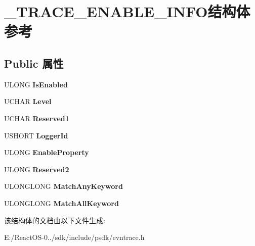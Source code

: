 \hypertarget{struct___t_r_a_c_e___e_n_a_b_l_e___i_n_f_o}{}\section{\+\_\+\+T\+R\+A\+C\+E\+\_\+\+E\+N\+A\+B\+L\+E\+\_\+\+I\+N\+F\+O结构体 参考}
\label{struct___t_r_a_c_e___e_n_a_b_l_e___i_n_f_o}
\subsection*{Public 属性}
\begin{DoxyCompactItemize}
\item 
\mbox{\label{struct___t_r_a_c_e___e_n_a_b_l_e___i_n_f_o_a775f218e083faada8795287cb9d85104}} 
U\+L\+O\+NG {\bfseries Is\+Enabled}
\item 
\mbox{\label{struct___t_r_a_c_e___e_n_a_b_l_e___i_n_f_o_a455ee3c4941acc7345e2a7b79f0bf937}} 
U\+C\+H\+AR {\bfseries Level}
\item 
\mbox{\label{struct___t_r_a_c_e___e_n_a_b_l_e___i_n_f_o_af6a93a302e9e4129d63e04016a44d098}} 
U\+C\+H\+AR {\bfseries Reserved1}
\item 
\mbox{\label{struct___t_r_a_c_e___e_n_a_b_l_e___i_n_f_o_a5573268f3e187c386714bfd3fb471eb0}} 
U\+S\+H\+O\+RT {\bfseries Logger\+Id}
\item 
\mbox{\label{struct___t_r_a_c_e___e_n_a_b_l_e___i_n_f_o_a8f1002e3a60c014a4c61a925f74d9060}} 
U\+L\+O\+NG {\bfseries Enable\+Property}
\item 
\mbox{\label{struct___t_r_a_c_e___e_n_a_b_l_e___i_n_f_o_a497b862916313d1f1760fa929be64da4}} 
U\+L\+O\+NG {\bfseries Reserved2}
\item 
\mbox{\label{struct___t_r_a_c_e___e_n_a_b_l_e___i_n_f_o_a6a81352508eba01b610e60c4256be929}} 
U\+L\+O\+N\+G\+L\+O\+NG {\bfseries Match\+Any\+Keyword}
\item 
\mbox{\label{struct___t_r_a_c_e___e_n_a_b_l_e___i_n_f_o_ad135fcf618066a50c6a56cdb8f47cb60}} 
U\+L\+O\+N\+G\+L\+O\+NG {\bfseries Match\+All\+Keyword}
\end{DoxyCompactItemize}


该结构体的文档由以下文件生成\+:\begin{DoxyCompactItemize}
\item 
E\+:/\+React\+O\+S-\/0../sdk/include/psdk/evntrace.\+h\end{DoxyCompactItemize}
